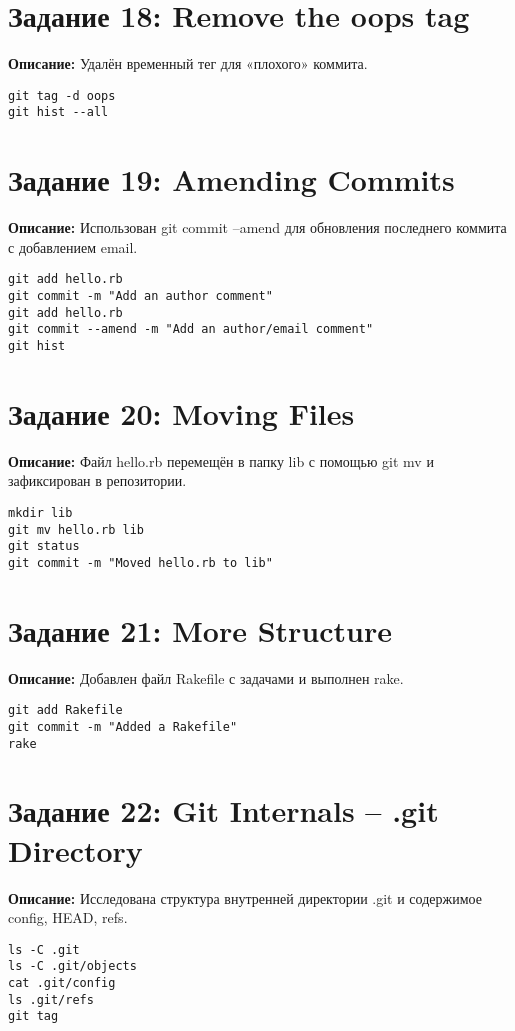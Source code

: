 \documentclass[a4paper,12pt]{report}
\begin{document}
\section*{Задание 18: Remove the oops tag}
\textbf{Описание:} Удалён временный тег для «плохого» коммита.
\begin{verbatim}
git tag -d oops
git hist --all
\end{verbatim}

\section*{Задание 19: Amending Commits}
\textbf{Описание:} Использован git commit --amend для обновления последнего коммита с добавлением email.
\begin{verbatim}
git add hello.rb
git commit -m "Add an author comment"
git add hello.rb
git commit --amend -m "Add an author/email comment"
git hist
\end{verbatim}

\section*{Задание 20: Moving Files}
\textbf{Описание:} Файл hello.rb перемещён в папку lib с помощью git mv и зафиксирован в репозитории.
\begin{verbatim}
mkdir lib
git mv hello.rb lib
git status
git commit -m "Moved hello.rb to lib"
\end{verbatim}

\section*{Задание 21: More Structure}
\textbf{Описание:} Добавлен файл Rakefile с задачами и выполнен rake.
\begin{verbatim}
git add Rakefile
git commit -m "Added a Rakefile"
rake
\end{verbatim}

\section*{Задание 22: Git Internals – .git Directory}
\textbf{Описание:} Исследована структура внутренней директории .git и содержимое config, HEAD, refs.
\begin{verbatim}
ls -C .git
ls -C .git/objects
cat .git/config
ls .git/refs
git tag
\end{verbatim}
\end{document}

